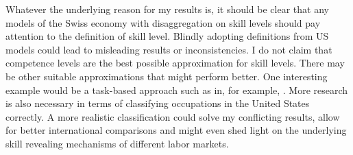 \documentclass[]{article}
\begin{document}
Whatever the underlying reason for my results is, it should be clear
that any models of the Swiss economy with disaggregation on skill
levels should pay attention to the definition of skill level. Blindly
adopting definitions from US models could lead to misleading results
or inconsistencies. I do not claim that competence levels are the best
possible approximation for skill levels. There may be other suitable
approximations that might perform better. One interesting example
would be a task-based approach such as in, for example,
\cite{SpitzOener.2006}. More research is also necessary in terms of
classifying occupations in the United States correctly. A more
realistic classification could solve my conflicting results, allow for
better international comparisons and might even shed light on the
underlying skill revealing mechanisms of different labor markets.


\newpage

\appendix
\end{document}
